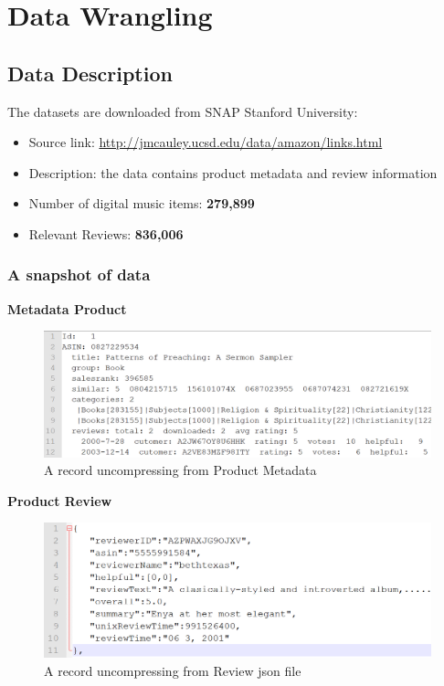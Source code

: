 \documentclass[a4paper,11pt]{article}
\begin{document}
	
\section{Data Wrangling}
	\subsection{Data Description}
		The datasets are downloaded from SNAP Stanford University:
		\begin{itemize}
			\item Source link: \url{http://jmcauley.ucsd.edu/data/amazon/links.html}
			\item Description: the data contains product metadata and review information 
			\item Number of digital music items: \textbf{279,899}
			\item Relevant Reviews: \textbf{836,006}
		\end{itemize}				
		
		\subsubsection{A snapshot of data}
		\textbf{Metadata Product}
		\begin{figure}[H]
			\includegraphics[width=1\textwidth, center]{pic2}
			\caption{A record uncompressing from Product Metadata}
		\end{figure}
		
		\textbf{Product Review}
		\begin{figure}[H]
			\includegraphics[width=1\textwidth, center]{pic3}
			\caption{A record uncompressing from Review json file}
		\end{figure}
		
\end{document}
